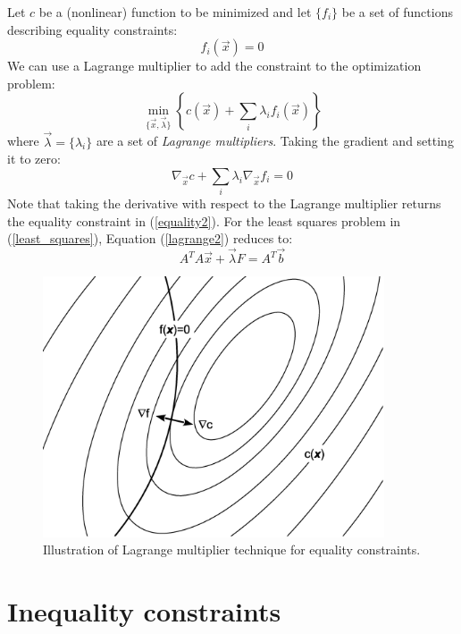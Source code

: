 \documentclass{article}
\newcommand{\mat}{A}
\newcommand{\sol}{b}
\newcommand{\eqmat}{F}
\newcommand{\cost}{c}
\newcommand{\eqfn}{f}
\newcommand{\coord}{x}
\begin{document}
Let $\cost$ be a (nonlinear) function to be minimized and let $\lbrace \eqfn_i \rbrace$ be a set of functions describing equality constraints:
\begin{equation}
	\eqfn_i(\vec \coord) = 0
 	\label{equality2}
\end{equation}
We can use a Lagrange multiplier to add the constraint to the optimization
problem:
\begin{equation}
	\min_{\lbrace \vec \coord, \vec \lambda \rbrace} \left \lbrace \cost(\vec \coord) + \sum_i \lambda_i \eqfn_i(\vec \coord) \right \rbrace
\end{equation}
where $\vec \lambda=\lbrace \lambda_i \rbrace$ are a set of {\it Lagrange multipliers}.
Taking the gradient and setting it to zero:
\begin{equation}
	\nabla_{\vec \coord} \cost + \sum_i \lambda_i \nabla_{\vec \coord} \eqfn_i = 0 
	\label{lagrange2}
\end{equation}
Note that taking the derivative with respect to the Lagrange multiplier
returns the equality constraint in (\ref{equality2}).
For the least squares problem in (\ref{least_squares}), 
Equation (\ref{lagrange2}) reduces to:
\begin{equation}
	\mat^T \mat \vec \coord + \vec \lambda \eqmat = \mat^T \vec \sol
\end{equation}
\citep{Lawson_Hanson1995}

\begin{figure}
	\includegraphics[width=0.9\textwidth]{Lagrange.eps}
	\caption{Illustration of Lagrange multiplier technique for equality constraints.}
\end{figure}

\section{Inequality constraints}
\end{document}
